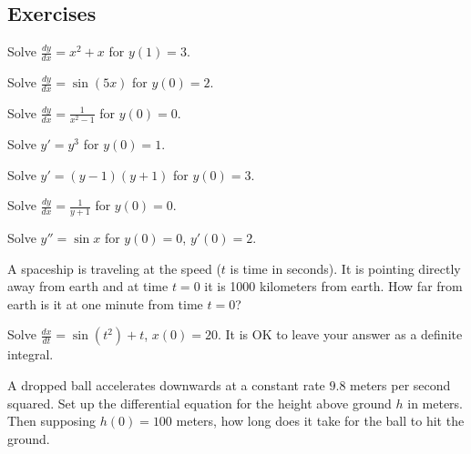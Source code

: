 \subsection{Exercises}

\begin{exercise}
Solve $\frac{dy}{dx} = x^2+x$ for $y(1)=3$.
\end{exercise}

\begin{exercise}
Solve $\frac{dy}{dx} = \sin (5x)$ for $y(0)=2$.
\end{exercise}

\begin{exercise}
Solve $\frac{dy}{dx} = \frac{1}{x^2-1}$ for $y(0)=0$.
\end{exercise}

\begin{exercise}
Solve $y' = y^3$ for $y(0)=1$.
\end{exercise}

\begin{exercise}
Solve $y' = (y-1)(y+1)$ for $y(0)=3$.
\end{exercise}

\begin{exercise}
Solve $\frac{dy}{dx} = \frac{1}{y+1}$ for $y(0)=0$.
\end{exercise}

\begin{exercise}[harder]
Solve $y'' = \sin x$ for $y(0)=0$, $y'(0) = 2$.
\end{exercise}

\begin{exercise}
A spaceship is traveling at the speed  ($t$ is
time in seconds).  It is pointing directly away from earth and at time $t=0$
it is 1000 kilometers from earth.  How far from earth is it at one minute from
time $t=0$?
\end{exercise}

\begin{exercise}
Solve $\frac{dx}{dt} = \sin(t^2)+t$, $x(0)=20$.  It is OK to leave your
answer as a definite integral.
\end{exercise}

\begin{exercise}
A dropped ball accelerates downwards at a constant rate $9.8$ meters per second
squared.  Set up the differential equation for the height above ground $h$ in meters.
Then supposing $h(0) = 100$ meters, how long does it take for the ball to hit
the ground.
\end{exercise}

